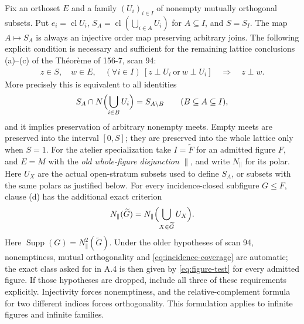 \begin{theorem}
\label{SA21-A16}
Fix an orthoset $E$ and a family $(U_i)_{i\in I}$ of nonempty mutually
orthogonal subsets. Put $e_i=\operatorname{cl}U_i$,
$S_A=\operatorname{cl}(\bigcup_{i\in A}U_i)$ for $A\subseteq I$,
and $S=S_I$. The map $A\mapsto S_A$ is always an injective order map
preserving arbitrary joins. The following explicit condition is
necessary and sufficient for the remaining lattice conclusions
(a)--(c) of the Théorème of 156-7, scan 94:
\begin{equation}\label{eq:figure-test}
\begin{gathered}
 z\in S,\quad w\in E,\quad
 (\forall i\in I)\ [z\perp U_i\ \text{or}\ w\perp U_i]
 \quad\Longrightarrow\quad z\perp w.
\end{gathered}
\end{equation}
More precisely this is equivalent to all identities
\[
 S_A\cap N\Bigl(\bigcup_{i\in B}U_i\Bigr)=S_{A\setminus B}
 \qquad(B\subseteq A\subseteq I),
\]
and it implies preservation of arbitrary nonempty meets. Empty meets
are preserved into the interval $[0,S]$; they are preserved into the
whole lattice only when $S=1$.
For the atelier specialization take $I=\widetilde F$ for an admitted
figure $F$, and $E=M$ with the \emph{old
whole-figure disjunction} $\parallel$, and write $N_\parallel$
for its polar. Here $U_X$ are the actual open-stratum subsets used
to define $S_A$, or subsets with the same polars as justified below.
For every incidence-closed subfigure $G\leq F$, clause (d) has the
additional exact criterion
\begin{equation}\label{eq:incidence-coverage}
 N_\parallel(\widetilde G)
 =N_\parallel\Bigl(\bigcup_{X\in\widetilde G}U_X\Bigr).
\end{equation}
Here $\operatorname{Supp}(G)=N_\parallel^2(\widetilde G)$.
Under the older hypotheses of scan 94, nonemptiness, mutual
orthogonality and \eqref{eq:incidence-coverage} are automatic;
the exact class asked for in A.4 is then given by
\eqref{eq:figure-test} for every admitted figure. If those hypotheses
are dropped, include all three of these requirements explicitly.
Injectivity forces nonemptiness, and the relative-complement formula
for two different indices forces orthogonality. This formulation
applies to infinite figures and infinite families.
\end{theorem}
